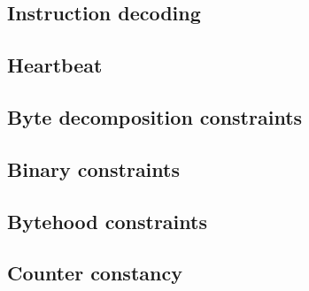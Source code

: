 \subsection{Instruction decoding}               \label{mmio: generalities: instruction decoding}                
\subsection{Heartbeat}                          \label{mmio: generalities: heartbeat}                           
\subsection{Byte decomposition constraints}     \label{mmio: generalities: generalities: byte decompositions}   
\subsection{Binary constraints}                 \label{mmio: generalities: specialized constraints: binary}     
\subsection{Bytehood constraints}               \label{mmio: generalities: bytehood constraints}                
\subsection{Counter constancy}                  \label{mmio: generalities: counter constancy}                   

